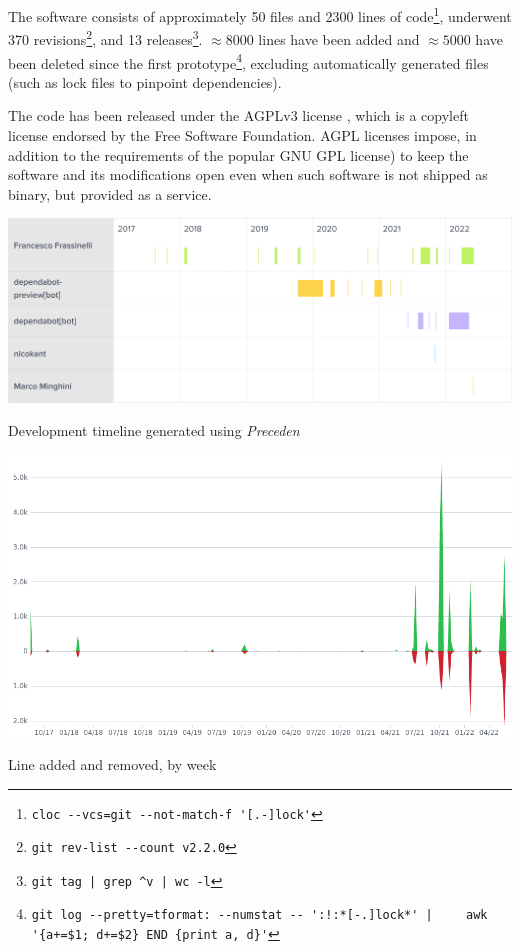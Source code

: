 \documentclass{Configuration_Files/PoliMi3i_thesis}
\begin{document}
The software consists of approximately 50 files and 2300 lines of code\footnote{\Verb+cloc --vcs=git --not-match-f '[.-]lock'+}, underwent 370 revisions\footnote{\Verb+git rev-list --count v2.2.0+}, and 13 releases\footnote{\Verb+git tag | grep ^v | wc -l+}. $ \approx 8000 $ lines have been added and $ \approx 5000 $ have been deleted since the first prototype\footnote{
\Verb_git log --pretty=tformat: --numstat -- ':!:*[-.]lock*' |_\newline
\Verb_    awk '{a+=$1; d+=$2} END {print a, d}'_
}, excluding automatically generated files (such as lock files to pinpoint dependencies).

The code has been released under the AGPLv3 license \cite{GNUAfferoGeneral}, which is a copyleft license endorsed by the Free Software Foundation. AGPL licenses impose, in addition to the requirements of the popular GNU GPL license) to keep the software and its modifications open even when such software is not shipped as binary, but provided as a service.

\begin{graph}[ht]
    \centering
    \includegraphics[width=1\textwidth]{Images/development_contributors.png}
    \caption[Development timeline]{Development timeline generated using \textit{Preceden} \cite{IsosmuptodatePreceden}}
    \label{graph:development_contributors}
\end{graph}

\begin{graph}[ht]
    \centering
    \includegraphics[width=1\textwidth]{Images/code_frequency.png}
    \caption[Line added and removed, by week]{Line added and removed, by week \cite{CommitActivityFrafra}}
    \label{graph:code_frequency}
\end{graph}
\end{document}

